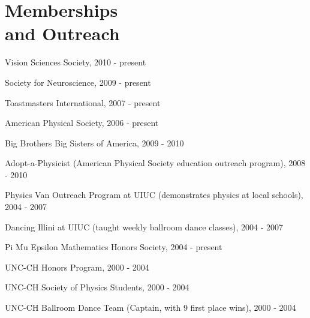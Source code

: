 \section{\sc Memberships\\and Outreach} %
\begin{list2}
\item[-] Vision Sciences Society, 2010 - present
\item[-] Society for Neuroscience, 2009 - present
\item[-] Toastmasters International, 2007 - present
\item[-] American Physical Society, 2006 - present
\item[-] Big Brothers Big Sisters of America, 2009 - 2010
\item[-] Adopt-a-Physicist (American Physical Society education outreach program), 2008 - 2010
\item[-] Physics Van Outreach Program at UIUC (demonstrates physics at local schools), 2004 - 2007
\item[-] Dancing Illini at UIUC (taught weekly ballroom dance classes), 2004 - 2007
\item[-] Pi Mu Epsilon Mathematics Honors Society, 2004 - present
\item[-] UNC-CH Honors Program, 2000 - 2004
\item[-] UNC-CH Society of Physics Students, 2000 - 2004
\item[-] UNC-CH Ballroom Dance Team (Captain, with 9 first place wins), 2000 - 2004
\end{list2}

